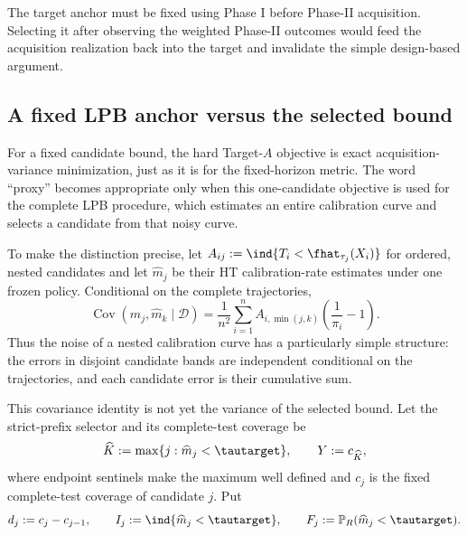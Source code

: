 The target anchor must be fixed using Phase I before Phase-II acquisition.
Selecting it after observing the weighted Phase-II outcomes would feed the
acquisition realization back into the target and invalidate the simple
design-based argument.

\subsection{A fixed LPB anchor versus the selected bound}
\label{sec:lpb_influence_dapro}

For a fixed candidate bound, the hard Target-$A$ objective is exact
acquisition-variance minimization, just as it is for the fixed-horizon metric.
The word ``proxy'' becomes appropriate only when this one-candidate objective
is used for the complete LPB procedure, which estimates an entire calibration
curve and selects a candidate from that noisy curve.

To make the distinction precise, let
$A_{ij}:=\ind{T_i<\fhat_{\tau_j}(X_i)}$ for ordered, nested candidates and
let $\widehat m_j$ be their HT calibration-rate estimates under one frozen
policy.  Conditional on the complete trajectories,
\begin{equation}
    \operatorname{Cov}(\widehat m_j,\widehat m_k\mid\mathcal D)
    =\frac{1}{n^2}\sum_{i=1}^n
      A_{i,\min(j,k)}\left(\frac{1}{\pi_i}-1\right).
    \label{eq:lpb_curve_covariance}
\end{equation}
Thus the noise of a nested calibration curve has a particularly simple
structure: the errors in disjoint candidate bands are independent conditional
on the trajectories, and each candidate error is their cumulative sum.

This covariance identity is not yet the variance of the selected bound.  Let
the strict-prefix selector and its complete-test coverage be
\begin{equation}
    \widehat K:=\max\{j:\widehat m_j<\tautarget\},
    \qquad
    Y:=c_{\widehat K},
    \label{eq:lpb_hard_selector}
\end{equation}
where endpoint sentinels make the maximum well defined and $c_j$ is the fixed
complete-test coverage of candidate $j$.  Put
\begin{equation}
    d_j:=c_j-c_{j-1},
    \qquad
    I_j:=\ind{\widehat m_j<\tautarget},
    \qquad
    F_j:=\mathbb P_R(\widehat m_j<\tautarget).
    \label{eq:lpb_crossing_probability}
\end{equation}

